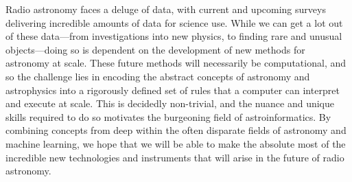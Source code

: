 \documentclass[11pt, a4paper]{book}
\makeatletter
\newcounter{savesection}
\newcounter{apdxsection}
\renewcommand\appendix{\par
  \setcounter{savesection}{\value{section}}%
  \setcounter{section}{\value{apdxsection}}%
  \setcounter{subsection}{0}%
  \gdef\thesection{\@Alph\c@section}}
\providecommand{\DIFdeltex}[1]{{\protect\color{red}\sout{#1}}}                      %
\providecommand{\DIFdelbegin}{} %
\providecommand{\DIFdelend}{} %
\providecommand{\DIFdel}[1]{\texorpdfstring{\DIFdeltex{#1}}{}} %
\newcommand{\DIFscaledelfig}{0.5}
\newlength{\DIFdelgraphicswidth} %
\newlength{\DIFdelgraphicsheight} %
\newcommand{\DIFdelincludegraphics}[2][]{%
\sbox{\DIFdelgraphicsbox}{\DIFOincludegraphics[#1]{#2}}%
\settoboxwidth{\DIFdelgraphicswidth}{\DIFdelgraphicsbox} %
\settoboxtotalheight{\DIFdelgraphicsheight}{\DIFdelgraphicsbox} %
\scalebox{\DIFscaledelfig}{%
\parbox[b]{\DIFdelgraphicswidth}{\usebox{\DIFdelgraphicsbox}\\[-\baselineskip] \rule{\DIFdelgraphicswidth}{0em}}\llap{\resizebox{\DIFdelgraphicswidth}{\DIFdelgraphicsheight}{%
\setlength{\unitlength}{\DIFdelgraphicswidth}%
\begin{picture}(1,1)%
\thicklines\linethickness{2pt} %
{\color[rgb]{1,0,0}\put(0,0){\framebox(1,1){}}}%
{\color[rgb]{1,0,0}\put(0,0){\line( 1,1){1}}}%
{\color[rgb]{1,0,0}\put(0,1){\line(1,-1){1}}}%
\end{picture}%
}\hspace*{3pt}}} %
} %
\DeclareRobustCommand{\DIFdelbegin}{\DIFOdelbegin \let\includegraphics\DIFdelincludegraphics} %
\DeclareRobustCommand{\DIFdelend}{\DIFOaddend \let\includegraphics\DIFOincludegraphics} %
\makeatother
\begin{document}
    Radio astronomy faces a deluge of data, with current and upcoming surveys delivering incredible amounts of data for science use. While we can get a lot out of these data---from investigations into new physics, to finding rare and unusual objects---doing so is dependent on the development of new methods for astronomy at scale. These future methods will necessarily be computational, and so the challenge lies in encoding the abstract concepts of astronomy and astrophysics into a rigorously defined set of rules that a computer can interpret and execute at scale. This is decidedly non-trivial, and the nuance and unique skills required to do so motivates the burgeoning field of astroinformatics. By combining concepts from deep within the often disparate fields of astronomy and machine learning, we hope that we will be able to make the absolute most of the incredible new technologies and instruments that will arise in the future of radio astronomy.





\DIFdelbegin %
\DIFdelend %

\DIFdelbegin %
\addcontentsline{toc}{chapter}{\DIFdel{Appendix}}
\DIFdelend %

\DIFdelbegin %
\end{document}
